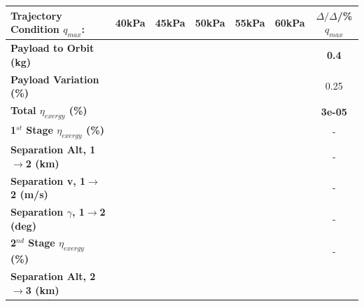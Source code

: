 \begin{table}[ht]
	\centering
	\begin{tabular}{l c c c c c c} 
		\hline \textbf{Trajectory Condition}   \qquad  $q_{max}$:
		&40kPa
		&45kPa
		&50kPa
		&55kPa
		&60kPa
		& $\Delta/\Delta$/\%$q_{max}$
		\\
		\hline \textbf{Payload to Orbit (kg)}
		& \textbf{\PayloadToOrbitqForty}
		& \textbf{\PayloadToOrbitqFortyFive}
		& \textbf{\PayloadToOrbitqStandard}
		& \textbf{\PayloadToOrbitqFiftyFive}
		& \textbf{\PayloadToOrbitqSixty}
		&\textbf{0.4}
		\\
		\textbf{Payload Variation (\%)}
		& \PayloadVarqForty
		& \PayloadVarqFortyFive
		& \PayloadVarqStandard
		& \PayloadVarqFiftyFive
		& \PayloadVarqSixty
		&0.25
		\\
		\textbf{Total $\eta_{exergy}$ (\%)}
		& \textbf{\totalExergyEffqForty}
		& \textbf{\totalExergyEffqFortyFive}
		& \textbf{\totalExergyEffqStandard}
		& \textbf{\totalExergyEffqFiftyFive}
		& \textbf{\totalExergyEffqSixty}
		& \textbf{3e-05}
		\\
		\hline 
		\textbf{1$^{st}$ Stage $\eta_{exergy}$ (\%)}
		& \textbf{\firstExergyEffqForty}
		& \textbf{\firstExergyEffqFortyFive}
		& \textbf{\firstExergyEffqStandard}
		& \textbf{\firstExergyEffqFiftyFive}
		& \textbf{\firstExergyEffqSixty}
		& -
		\\
		\textbf{Separation Alt, 1$\rightarrow$2 (km)}
		& \firstsecondSeparationAltqForty
		& \firstsecondSeparationAltqFortyFive
		& \firstsecondSeparationAltqStandard
		& \firstsecondSeparationAltqFiftyFive
		& \firstsecondSeparationAltqSixty
		& -
		\\
		\textbf{Separation v, 1$\rightarrow$2 (m/s)}
		& \firstsecondSeparationvqForty
		& \firstsecondSeparationvqFortyFive
		& \firstsecondSeparationvqStandard
		& \firstsecondSeparationvqFiftyFive
		& \firstsecondSeparationvqSixty
		& -
		\\
		\textbf{Separation $\gamma$, 1$\rightarrow$2 (deg)}
		& \firstsecondSeparationgammaqForty
		& \firstsecondSeparationgammaqFortyFive
		& \firstsecondSeparationgammaqStandard
		& \firstsecondSeparationgammaqFiftyFive
		& \firstsecondSeparationgammaqSixty
		& -
		\\
		\hline 
		\textbf{2$^{nd}$ Stage $\eta_{exergy}$ (\%)}
		& \textbf{\secondExergyEffqForty}
		& \textbf{\secondExergyEffqFortyFive}
		& \textbf{\secondExergyEffqStandard}
		& \textbf{\secondExergyEffqFiftyFive}
		& \textbf{\secondExergyEffqSixty}
		& -
		\\
		\textbf{Separation Alt, 2$\rightarrow$3 (km)}

\end{tabular}
\end{table}
